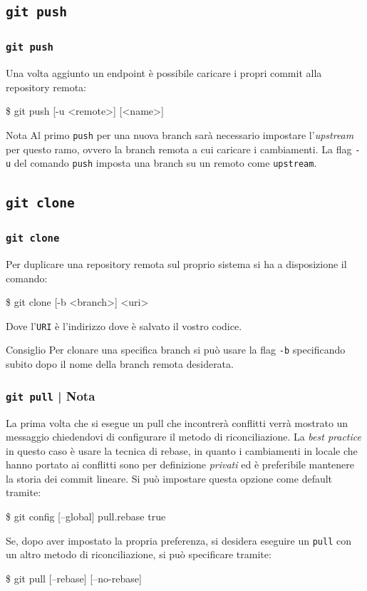 \documentclass{beamer}
\begin{document}
\subsection{\texttt{git push}}
\begin{frame}
  \frametitle{\texttt{git push}}
  Una volta aggiunto un endpoint \`e possibile caricare i propri commit alla
  repository remota:
  \begin{semiverbatim}
  \$ git push [-u <remote>] [<name>]
  \end{semiverbatim} \pause
  \begin{block}{Nota}
    Al primo \texttt{push} per una nuova branch sar\`a necessario impostare
    l'\emph{upstream} per questo ramo, ovvero la branch remota a cui caricare i
    cambiamenti. La flag \texttt{-u} del comando \texttt{push} imposta una
    branch su un remoto come \texttt{upstream}.
  \end{block}
\end{frame}

\subsection{\texttt{git clone}}
\begin{frame}
  \frametitle{\texttt{git clone}}
  Per duplicare una repository remota sul proprio sistema si ha a disposizione
  il comando:
  \begin{semiverbatim}
  \$ git clone [-b <branch>] <uri>
  \end{semiverbatim}
  Dove l'\texttt{URI} \`e l'indirizzo dove \`e salvato il vostro codice.
  \pause
  \begin{block}{Consiglio}
    Per clonare una specifica branch si pu\`o usare la flag \texttt{-b}
    specificando subito dopo il nome della branch remota desiderata.
  \end{block}
\end{frame}

\begin{frame}
  \frametitle{\texttt{git pull} | Nota}
  La prima volta che si esegue un pull che incontrer\`a conflitti verr\`a
  mostrato un messaggio chiedendovi di configurare il metodo di riconciliazione.
  La \emph{best practice} in questo caso \`e usare la tecnica di rebase, in
  quanto i cambiamenti in locale che hanno portato ai conflitti sono per
  definizione \emph{privati} ed \`e preferibile mantenere la storia dei commit
  lineare. Si pu\`o impostare questa opzione come default tramite:
  \begin{semiverbatim}
  \$ git config [--global] pull.rebase true
  \end{semiverbatim}
  \pause
  Se, dopo aver impostato la propria preferenza, si desidera eseguire un
  \texttt{pull} con un altro metodo di riconciliazione, si pu\`o specificare tramite:
  \begin{semiverbatim}
  \$ git pull [--rebase] [--no-rebase]
  \end{semiverbatim}
\end{frame}
\end{document}

